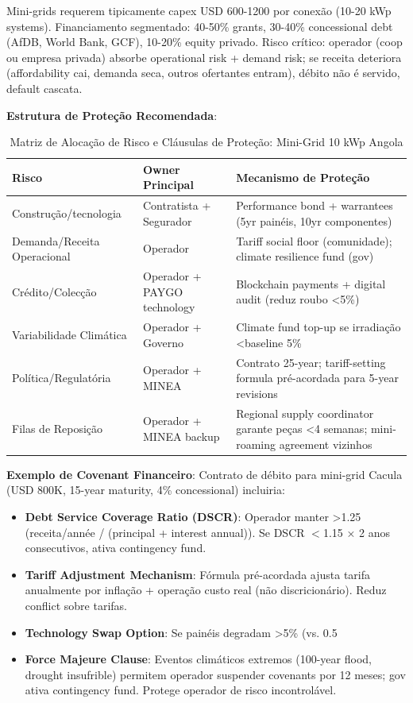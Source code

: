 \documentclass[12pt, a4paper]{article}
\begin{document}
Mini-grids requerem tipicamente capex USD 600-1200 por conexão (10-20 kWp systems). Financiamento segmentado: 40-50\% grants, 30-40\% concessional debt (AfDB, World Bank, GCF), 10-20\% equity privado. Risco crítico: operador (coop ou empresa privada) absorbe operational risk + demand risk; se receita deteriora (affordability cai, demanda seca, outros ofertantes entram), débito não é servido, default cascata.

\textbf{Estrutura de Proteção Recomendada}:

\begin{table}[H]
\centering
\caption{Matriz de Alocação de Risco e Cláusulas de Proteção: Mini-Grid 10 kWp Angola}
\label{tab:risk_allocation}
\small
\begin{tabular}{|l|l|l|}
\hline
\textbf{Risco} & \textbf{Owner Principal} & \textbf{Mecanismo de Proteção} \\
\hline
Construção/tecnologia & Contratista + Segurador & Performance bond + warrantees (5yr painéis, 10yr componentes) \\
\hline
Demanda/Receita Operacional & Operador & Tariff social floor (comunidade); climate resilience fund (gov) \\
\hline
Crédito/Colecção & Operador + PAYGO technology & Blockchain payments + digital audit (reduz roubo <5\%) \\
\hline
Variabilidade Climática & Operador + Governo & Climate fund top-up se irradiação <baseline 5\% \\
\hline
Política/Regulatória & Operador + MINEA & Contrato 25-year; tariff-setting formula pré-acordada para 5-year revisions \\
\hline
Filas de Reposição & Operador + MINEA backup & Regional supply coordinator garante peças <4 semanas; mini-roaming agreement vizinhos \\
\hline
\end{tabular}
\end{table}

\textbf{Exemplo de Covenant Financeiro}: Contrato de débito para mini-grid Cacula (USD 800K, 15-year maturity, 4\% concessional) incluiria:
\begin{itemize}
\item \textbf{Debt Service Coverage Ratio (DSCR)}: Operador manter >1.25 (receita/année / (principal + interest annual)). Se DSCR $<$1.15 × 2 anos consecutivos, ativa contingency fund.
\item \textbf{Tariff Adjustment Mechanism}: Fórmula pré-acordada ajusta tarifa anualmente por inflação + operação custo real (não discricionário). Reduz conflict sobre tarifas.
\item \textbf{Technology Swap Option}: Se painéis degradam >5\% (vs. 0.5%
\item \textbf{Force Majeure Clause}: Eventos climáticos extremos (100-year flood, drought insufrible) permitem operador suspender covenants por 12 meses; gov ativa contingency fund. Protege operador de risco incontrolável.
\end{itemize}
\end{document}

